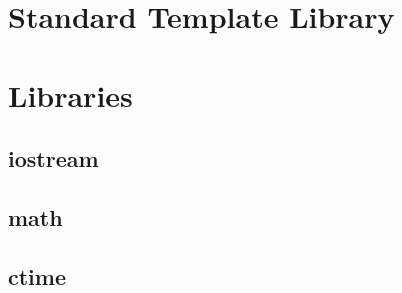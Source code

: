 \documentclass[10pt,a4paper]{scrartcl}
\begin{document}
\begin{multicols*}{2}
\section{Standard Template Library}

\section{Libraries}

\subsection{iostream}

\subsection{math}

\subsection{ctime}







\end{multicols*}
\end{document}
